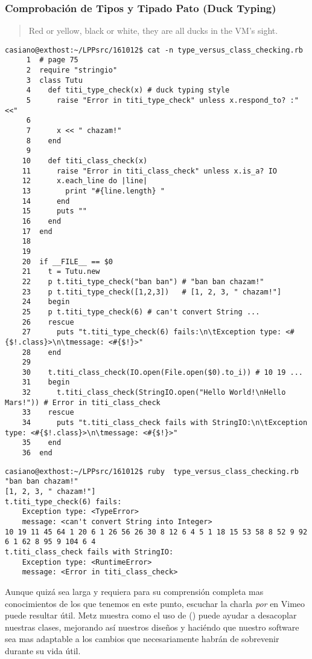 \subsubsection{Comprobación de Tipos y Tipado Pato (Duck Typing)}

\begin{quote}
Red or yellow, black or white, they are all ducks in the VM’s sight. 
\end{quote}

\label{subsub:tiposypatos}
\begin{verbatim}
casiano@exthost:~/LPPsrc/161012$ cat -n type_versus_class_checking.rb 
     1	# page 75
     2	require "stringio"
     3	class Tutu
     4	  def titi_type_check(x) # duck typing style
     5	    raise "Error in titi_type_check" unless x.respond_to? :"<<"
     6	
     7	    x << " chazam!"
     8	  end
     9	
    10	  def titi_class_check(x)
    11	    raise "Error in titi_class_check" unless x.is_a? IO
    12	    x.each_line do |line|
    13	      print "#{line.length} "
    14	    end
    15	    puts ""
    16	  end
    17	end
    18	    
    19	
    20	if __FILE__ == $0
    21	  t = Tutu.new
    22	  p t.titi_type_check("ban ban") # "ban ban chazam!"
    23	  p t.titi_type_check([1,2,3])   # [1, 2, 3, " chazam!"] 
    24	  begin
    25	  p t.titi_type_check(6) # can't convert String ...
    26	  rescue
    27	    puts "t.titi_type_check(6) fails:\n\tException type: <#{$!.class}>\n\tmessage: <#{$!}>"
    28	  end
    29	
    30	  t.titi_class_check(IO.open(File.open($0).to_i)) # 10 19 ...
    31	  begin
    32	    t.titi_class_check(StringIO.open("Hello World!\nHello Mars!")) # Error in titi_class_check
    33	  rescue
    34	    puts "t.titi_class_check fails with StringIO:\n\tException type: <#{$!.class}>\n\tmessage: <#{$!}>"
    35	  end
    36	end
\end{verbatim}

\begin{verbatim}
casiano@exthost:~/LPPsrc/161012$ ruby  type_versus_class_checking.rb 
"ban ban chazam!"
[1, 2, 3, " chazam!"]
t.titi_type_check(6) fails:
	Exception type: <TypeError>
	message: <can't convert String into Integer>
10 19 11 45 64 1 20 6 1 26 56 26 30 8 12 6 4 5 1 18 15 53 58 8 52 9 92 6 1 62 8 95 9 104 6 4 
t.titi_class_check fails with StringIO:
	Exception type: <RuntimeError>
	message: <Error in titi_class_check>
\end{verbatim}

Aunque quizá sea larga y requiera para su comprensión completa 
mas conocimientos de los que tenemos en este punto,
escuchar la charla 
\emph{
 por 
}
en Vimeo puede resultar útil. 
Metz 
muestra como el uso de  () 
puede ayudar a desacoplar nuestras
clases, mejorando así nuestros diseños y haciéndo que nuestro software 
sea mas adaptable a los cambios que necesariamente habrán de sobrevenir durante 
su vida útil.

